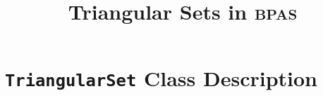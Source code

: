 \documentclass{article}
\title{Triangular Sets in \textsc{bpas}}
\date{}
\begin{document}
\maketitle{}

\section{\texttt{TriangularSet} Class Description}




\end{document}
